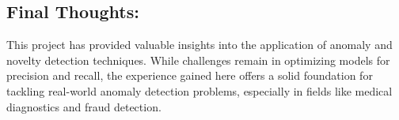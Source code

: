 \documentclass[11pt]{article}
\begin{document}
\subsection{Final Thoughts:}\label{final-thoughts}

This project has provided valuable insights into the application of
anomaly and novelty detection techniques. While challenges remain in
optimizing models for precision and recall, the experience gained here
offers a solid foundation for tackling real-world anomaly detection
problems, especially in fields like medical diagnostics and fraud
detection.


    
    
    
\end{document}
